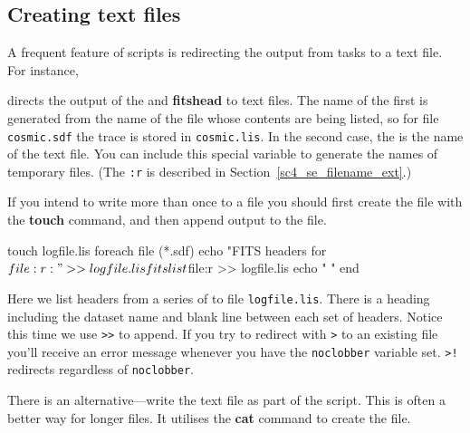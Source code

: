 \documentclass[twoside,11pt,nolof]{starlink}
\providecommand{\latexelsehtml}[2]{#1}
\providecommand{\HDSref}{\xref{HDS}{sun92}{}}
\providecommand{\NDFrefa}[1]{\xref{#1}{sun33}{}}
\begin{document}
\newpage
\subsection{Creating text files
\label{sc4_se_create_textfiles}}

A frequent feature of scripts is redirecting the output from tasks to a
text file.  For instance,

\begin{small}
\end{small}
directs the output of the  and {\bf
fitshead} to text files. The name of the first is generated from the
name of the file whose contents are being listed, so for \textsf{\HDSref}
file \texttt{cosmic.sdf} the trace is stored in \texttt{cosmic.lis}.  In the
second case, the  is the name of the text file.  You can include
this special variable to generate the names of temporary files.  (The
\texttt{:r} is described \latexelsehtml{in
Section~\ref{sc4_se_filename_ext}.)}{\htmlref{here}{sc4_se_filename_ext}.)}

If you intend to write more than once to a file you should first create
the file with the \textbf{touch} command, and then append output to the file.

\begin{small}
\begin{terminalv}
     touch logfile.lis
     foreach file (*.sdf)
        echo "FITS headers for $file:r:"  >> logfile.lis
        fitslist $file:r >> logfile.lis
        echo " "
     end
\end{terminalv}
\end{small}
Here we list  headers from a series of \NDFrefa{\textsf{NDF}s}
to file \texttt{logfile.lis}.  There is a heading including the dataset
name and blank line between each set of headers.  Notice this time
we use \texttt{>>} to append.  If you try to redirect with \texttt{>}
to an existing file you'll receive an error message whenever you have
the \texttt{noclobber} variable set.  \texttt{>!} redirects regardless
of \texttt{noclobber}.
\bigskip\medskip

There is an alternative---write the text file as part of the script.
This is often a better way for longer files.  It utilises
the \textbf{cat} command to create the file.
\end{document}
